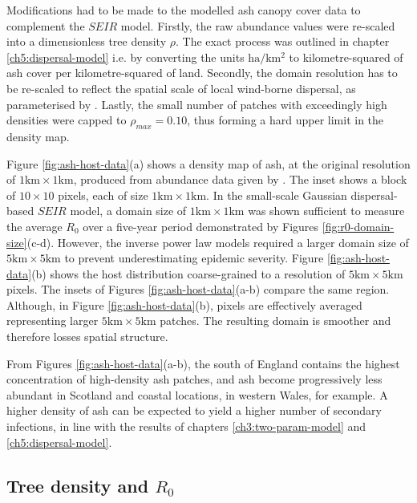 Modifications had to be made to the modelled ash canopy cover data to complement the $SEIR$ model. 
Firstly, the raw abundance values were re-scaled into a dimensionless tree density $\rho$. 
The exact process was outlined in chapter \ref{ch5:dispersal-model} 
i.e. by converting the units $\mathrm{ha/km^2}$ to kilometre-squared of ash cover per kilometre-squared of land. Secondly, 
the domain resolution has to be re-scaled to reflect the spatial scale of local wind-borne dispersal, as parameterised by \cite{grosdidier2018tracking}.
Lastly, the small number of patches with exceedingly high densities were capped to $\rho_{max} = 0.10$, thus forming a hard upper limit in the density map.

Figure \ref{fig:ash-host-data}(a) shows a density map of ash, at the original resolution of $\mathrm{1km}\times \mathrm{1km}$, produced from abundance data given by \cite{hill.data}.
The inset shows a block of $10\times10$ pixels, each of size $1\mathrm{km} \times 1 \mathrm{km}$.
In the small-scale Gaussian dispersal-based $SEIR$ model, a domain size of $\mathrm{1km}\times \mathrm{1km}$ was shown sufficient to measure the average $R_0$ over a five-year period \textemdash demonstrated by Figures \ref{fig:r0-domain-size}(c-d).
However, the inverse power law models required a larger domain size of $\mathrm{5km}\times \mathrm{5km}$ to prevent underestimating epidemic severity.
Figure \ref{fig:ash-host-data}(b) shows the host distribution coarse-grained to a resolution of $\mathrm{5km}\times \mathrm{5km}$ pixels.
The insets of Figures \ref{fig:ash-host-data}(a-b) compare the same region.
Although, in Figure \ref{fig:ash-host-data}(b), pixels are effectively averaged representing larger $5\mathrm{km} \times 5 \mathrm{km}$ patches.
The resulting domain is smoother and therefore losses spatial structure.

From Figures \ref{fig:ash-host-data}(a-b), the south of England contains the highest concentration of high-density ash patches, and ash become progressively less abundant in Scotland and coastal locations, 
in western Wales, for example. 
A higher density of ash can be expected to yield a higher number of secondary infections, in line with the results of chapters \ref{ch3:two-param-model} and \ref{ch5:dispersal-model}.

\subsection{Tree density and $R_0$}
\label{section:r0-tree-density}

